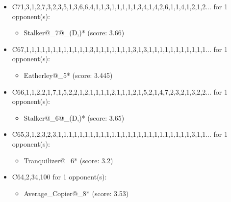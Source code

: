 \begin{appendices}
\begin{itemize}
    \item C71,3,1,2,7,3,2,3,5,1,3,6,6,4,1,1,3,1,1,1,1,1,3,4,1,4,2,6,1,1,4,1,2,1,2... for 1 opponent(s):
    \begin{multicols}{3}
         \begin{itemize}
            \item Stalker@\_7@\_(D,)* (score: 3.66)
        \end{itemize}
     \end{multicols}
     
    \item C67,1,1,1,1,1,1,1,1,1,1,1,1,3,1,1,1,1,1,1,1,3,1,3,1,1,1,1,1,1,1,1,1,1,1... for 1 opponent(s):
    \begin{multicols}{3}
         \begin{itemize}
            \item Eatherley@\_5* (score: 3.445)
        \end{itemize}
     \end{multicols}
     
    \item C66,1,1,2,2,1,7,1,5,2,2,1,2,1,1,1,1,2,1,1,1,2,1,5,2,1,4,7,2,3,2,1,3,2,2... for 1 opponent(s):
    \begin{multicols}{3}
         \begin{itemize}
            \item Stalker@\_6@\_(D,)* (score: 3.65)
        \end{itemize}
     \end{multicols}
     
    \item C65,3,1,2,3,2,3,1,1,1,1,1,1,1,1,1,1,1,1,1,1,1,1,1,1,1,1,1,1,1,1,1,3,1,1... for 1 opponent(s):
    \begin{multicols}{3}
         \begin{itemize}
            \item Tranquilizer@\_6* (score: 3.2)
        \end{itemize}
     \end{multicols}
     
    \item C64,2,34,100 for 1 opponent(s):
    \begin{multicols}{3}
         \begin{itemize}
            \item Average\_Copier@\_8* (score: 3.53)
        \end{itemize}
     \end{multicols}
     

\end{itemize}
\end{appendices}
